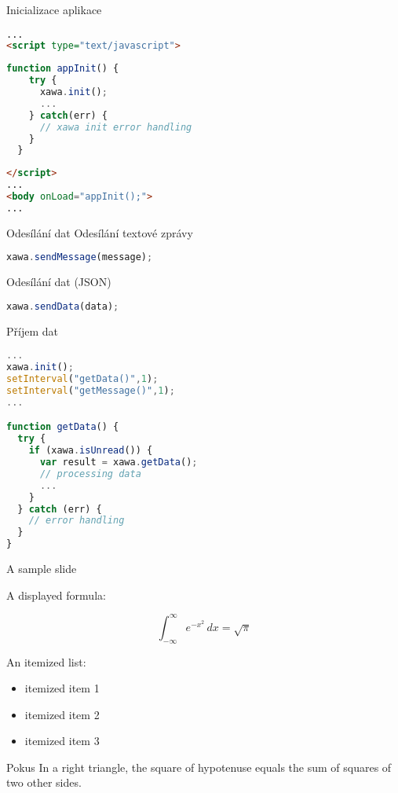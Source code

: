 \documentclass[9pt]{beamer}
\begin{document}
\begin{frame}
\end{frame}

\begin{frame}[fragile]{Inicializace aplikace}

		\begin{lstlisting}[language=HTML]
...
<script type="text/javascript">
		\end{lstlisting}
		\begin{lstlisting}[language=JavaScript]
  function appInit() {
    try {
      xawa.init();
      ...
    } catch(err) {
      // xawa init error handling
    }
  }
  		\end{lstlisting}
		\begin{lstlisting}[language=HTML]  	
</script>
...
<body onLoad="appInit();">
...
		\end{lstlisting}

\end{frame}

\begin{frame}[fragile]{Odesílání dat}
Odesílání textové zprávy
	\begin{lstlisting}[language=JavaScript]
xawa.sendMessage(message);	
	\end{lstlisting}
	
Odesílání dat (JSON)
	\begin{lstlisting}[language=JavaScript]
xawa.sendData(data);
	\end{lstlisting}
\end{frame}

\begin{frame}[fragile]{Příjem dat}

	\begin{lstlisting}[language=JavaScript]
...
xawa.init();
setInterval("getData()",1);
setInterval("getMessage()",1);
...		

function getData() {
  try {
    if (xawa.isUnread()) {
      var result = xawa.getData();
      // processing data
      ...
    }
  } catch (err) {
    // error handling
  }
}
	\end{lstlisting}
	
\end{frame}

\begin{frame}{A sample slide}

A displayed formula:

\[
  \int_{-\infty}^\infty e^{-x^2} \, dx = \sqrt{\pi}
\]

An itemized list:

\begin{itemize}
  \item itemized item 1
  \item itemized item 2
  \item itemized item 3
\end{itemize}

\begin{block}{Pokus}
  In a right triangle, the square of hypotenuse equals
  the sum of squares of two other sides.
\end{block}

\end{frame}
\end{document}

